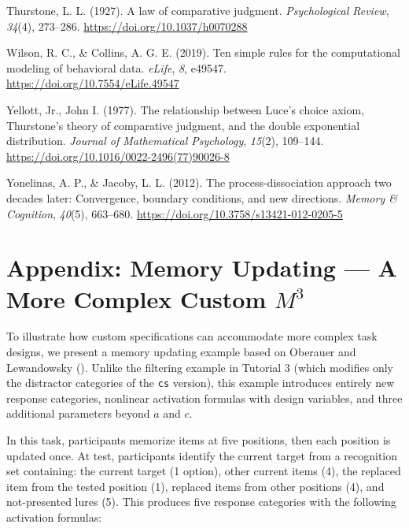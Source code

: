 \documentclass[
  man,
  floatsintext,
  longtable,
  nolmodern,
  notxfonts,
  notimes,
  colorlinks=true,linkcolor=blue,citecolor=blue,urlcolor=blue]{apa7}
\newlength{\cslhangindent}
\newenvironment{CSLReferences}[2] %
 {\begin{list}{}{%
  \setlength{\itemindent}{0pt}
  \setlength{\leftmargin}{0pt}
  \setlength{\parsep}{0pt}
  \ifodd #1
   \setlength{\leftmargin}{\cslhangindent}
   \setlength{\itemindent}{-1\cslhangindent}
  \fi
  \setlength{\itemsep}{#2\baselineskip}}}
 {\end{list}}
\begin{document}
\begin{CSLReferences}{1}{0}
Thurstone, L. L. (1927). A law of comparative judgment.
\emph{Psychological Review}, \emph{34}(4), 273--286.
\url{https://doi.org/10.1037/h0070288}

Wilson, R. C., \& Collins, A. G. E. (2019). Ten simple rules for the
computational modeling of behavioral data. \emph{eLife}, \emph{8},
e49547. \url{https://doi.org/10.7554/eLife.49547}

Yellott, Jr., John I. (1977). The relationship between {L}uce's choice
axiom, {T}hurstone's theory of comparative judgment, and the double
exponential distribution. \emph{Journal of Mathematical Psychology},
\emph{15}(2), 109--144.
\url{https://doi.org/10.1016/0022-2496(77)90026-8}

Yonelinas, A. P., \& Jacoby, L. L. (2012). The process-dissociation
approach two decades later: Convergence, boundary conditions, and new
directions. \emph{Memory \& Cognition}, \emph{40}(5), 663--680.
\url{https://doi.org/10.3758/s13421-012-0205-5}

\end{CSLReferences}

\newpage

\appendix

\section{\texorpdfstring{Appendix: Memory Updating --- A More Complex
Custom
\(M^3\)}{Appendix: Memory Updating --- A More Complex Custom M\^{}3}}\label{apx-appendix-memory-updating-a-more-complex-custom-m3}

To illustrate how custom specifications can accommodate more complex
task designs, we present a memory updating example based on Oberauer and
Lewandowsky (). Unlike the
filtering example in Tutorial 3 (which modifies only the distractor
categories of the \texttt{cs} version), this example introduces entirely
new response categories, nonlinear activation formulas with design
variables, and three additional parameters beyond \(a\) and \(c\).

In this task, participants memorize items at five positions, then each
position is updated once. At test, participants identify the current
target from a recognition set containing: the current target (1 option),
other current items (4), the replaced item from the tested position (1),
replaced items from other positions (4), and not-presented lures (5).
This produces five response categories with the following activation
formulas:
\end{document}
